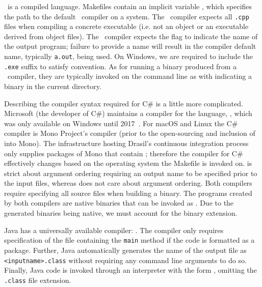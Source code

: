 {{{{{\CC~is a compiled language. Makefiles contain an implicit variable , which specifies the path to the default \CC~compiler on a system. The \CC~compiler expects all \texttt{.cpp} files when compiling a concrete executable (i.e. not an object or an executable derived from object files). The \CC~compiler expects the  flag to indicate the name of the output program; failure to provide a name will result in the compiler default name, typically \texttt{a.out}, being used. On Windows, we are required to include the \texttt{.exe} suffix to satisfy convention. As for running a binary produced from a \CC~compiler, they are typically invoked on the command line as  with  indicating a binary in the current directory.

Describing the compiler syntax required for C\# is a little more complicated. Microsoft (the developer of C\#) maintains a compiler for the language, , which was only available on Windows until 2017~\cite{Roslyn}. For macOS and Linux the C\# compiler is Mono Project's  compiler (prior to the open-sourcing and inclusion of  into Mono). The infrastructure hosting Drasil's continuous integration process only supplies packages of Mono that contain ; therefore the compiler for C\# effectively changes based on the operating system the Makefile is invoked on.  is strict about argument ordering requiring an output name to be specified prior to the input files, whereas  does not care about argument ordering. Both compilers require specifying all source files when building a binary. The programs created by both compilers are native binaries that can be invoked as . Due to the generated binaries being native, we must account for the binary extension.

Java has a universally available compiler: . The compiler only requires specification of the file containing the \texttt{main} method if the code is formatted as a package. Further, Java automatically generates the name of the output file as \texttt{<inputname>.class} without requiring any command line arguments to do so. Finally, Java code is invoked through an interpreter  with the form , omitting the \texttt{.class} file extension.

}}}}}
